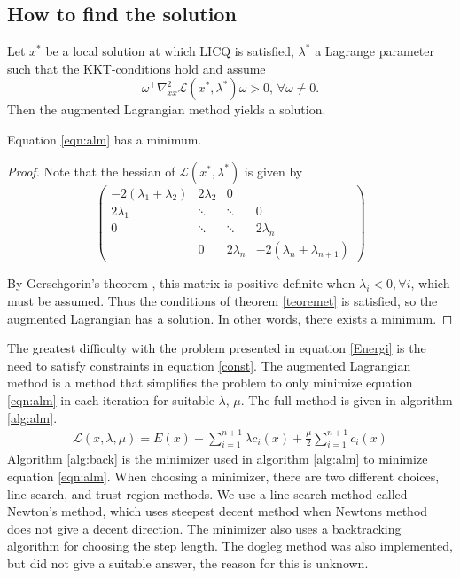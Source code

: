 \subsection{How to find the solution} \label{sec:alg}
\begin{theorem}\cite{teoremet}
Let $x^*$ be a local solution at which LICQ is satisfied, $\lambda^*$ a Lagrange parameter such that the KKT-conditions hold and assume
\[\omega^\top \nabla_{xx}^2 \mathcal L(x^*,\lambda^*)\omega > 0,\,\forall \omega\neq 0.\]
Then the augmented Lagrangian method yields a solution.
\label{teoremet}\end{theorem}
\begin{proposition}
Equation \eqref{eqn:alm} has a minimum.
\end{proposition}
\begin{proof}
Note that the hessian of $\mathcal L(x^*,\lambda^*)$ is given by
\begin{equation*}
\begin{pmatrix}
 -2(\lambda_1 +\lambda_2) & 2\lambda_2 & 0 &  \\
2\lambda_1 & \ddots & \ddots & 0\\
 0 &  \ddots & \ddots  & 2\lambda_n \\
& 0& 2\lambda_{n} & -2(\lambda_n +\lambda_{n+1})
\end{pmatrix}
\end{equation*}

By Gerschgorin's theorem \cite{gresgorian}, this matrix is positive definite when $\lambda_i < 0, \forall i$, which must be assumed. Thus the conditions of theorem \ref{teoremet} is satisfied, so the augmented Lagrangian has a solution. In other words, there exists a minimum. 
\end{proof}

The greatest difficulty with the problem presented in equation \eqref{Energi}  is the need to satisfy constraints in equation \eqref{const}. The augmented Lagrangian method is a method that simplifies the problem to only minimize equation \eqref{eqn:alm} in each iteration for suitable $\lambda,\,\mu$. The full method is given in algorithm \ref{alg:alm}.
\begin{align} \label{eqn:alm}
\mathcal{L}(x,\lambda,\mu) = E(x) - \sum \limits_{i = 1}^{n+1} \lambda c_i(x) + \frac{\mu}{2} \sum \limits_{i =1}^{n+1}c_i(x) 
\end{align}
Algorithm \ref{alg:back} is the minimizer used in algorithm \ref{alg:alm} to minimize equation \eqref{eqn:alm}. When choosing a minimizer, there are two different choices, line search, and trust region methods. We use a line search method called Newton's method, which uses steepest decent method when Newtons method does not give a decent direction. The minimizer also uses a backtracking algorithm for choosing the step length. The dogleg method was also implemented, but did not give a suitable answer, the reason for this is unknown.

